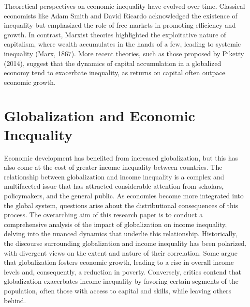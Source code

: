 Theoretical perspectives on economic inequality have evolved over time. Classical economists like Adam Smith and David Ricardo acknowledged the existence of inequality but emphasized the role of free markets in promoting efficiency and growth. In contrast, Marxist theories highlighted the exploitative nature of capitalism, where wealth accumulates in the hands of a few, leading to systemic inequality (Marx, 1867). More recent theories, such as those proposed by Piketty (2014), suggest that the dynamics of capital accumulation in a globalized economy tend to exacerbate inequality, as returns on capital often outpace economic growth.


\section{Globalization and Economic Inequality}\label{globalizationEconomicInequality}

Economic development has benefited from increased globalization, but this has also come at the cost of greater income inequality between countries.
The relationship between globalization and income inequality is a complex and 
multifaceted issue that has attracted considerable attention from scholars, policymakers, and the general public. As economies become more integrated into the global system, questions arise about the distributional consequences of this process. The overarching aim of this research paper is to conduct a comprehensive analysis of the impact of globalization on income inequality, delving into the nuanced dynamics that underlie this relationship.
Historically, the discourse surrounding globalization and income inequality has been polarized, with divergent views on the extent and nature of their correlation. Some argue that globalization fosters economic growth, leading to a rise in overall income levels and, consequently, a reduction in poverty. Conversely, critics contend that globalization exacerbates income inequality by favoring certain segments of the population, often those with access to capital and skills, while leaving others behind.

